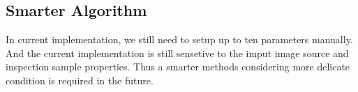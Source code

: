 	\subsection{Smarter Algorithm}
		In current implementation, we still need to setup up to ten parameters manually.
		And the current implementation is still sensetive to the imput image source and inspection sample properties.
		Thus a smarter methods considering more delicate condition is required in the future.